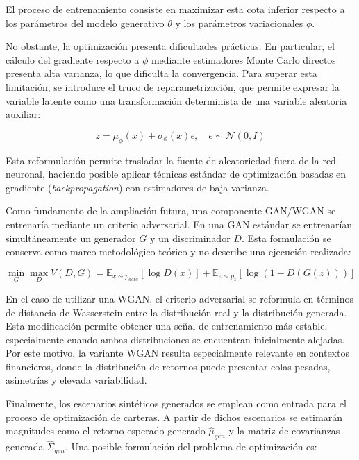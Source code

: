 El proceso de entrenamiento consiste en maximizar esta cota inferior respecto a los parámetros del modelo generativo $\theta$ y los parámetros variacionales $\phi$.

No obstante, la optimización presenta dificultades prácticas. En particular, el cálculo del gradiente respecto a $\phi$ mediante estimadores Monte Carlo directos presenta alta varianza, lo que dificulta la convergencia. Para superar esta limitación, se introduce el truco de reparametrización, que permite expresar la variable latente como una transformación determinista de una variable aleatoria auxiliar:

\begin{equation}
z
=
\mu_{\phi}(x)
+
\sigma_{\phi}(x)\epsilon,
\quad
\epsilon \sim \mathcal{N}(0,I)
\end{equation}

Esta reformulación permite trasladar la fuente de aleatoriedad fuera de la red neuronal, haciendo posible aplicar técnicas estándar de optimización basadas en gradiente (\textit{backpropagation}) con estimadores de baja varianza.

Como fundamento de la ampliación futura, una componente GAN/WGAN se entrenaría mediante un criterio adversarial. En una GAN estándar se entrenarían simultáneamente un generador $G$ y un discriminador $D$. Esta formulación se conserva como marco metodológico teórico y no describe una ejecución realizada:

\begin{equation}
\min_{G}\max_{D} V(D,G)
=
\mathbb{E}_{x \sim p_{data}}
\left[
\log D(x)
\right]
+
\mathbb{E}_{z \sim p_z}
\left[
\log \left(1-D(G(z))\right)
\right]
\end{equation}

En el caso de utilizar una WGAN, el criterio adversarial se reformula en términos de distancia de Wasserstein entre la distribución real y la distribución generada. Esta modificación permite obtener una señal de entrenamiento más estable, especialmente cuando ambas distribuciones se encuentran inicialmente alejadas. Por este motivo, la variante WGAN resulta especialmente relevante en contextos financieros, donde la distribución de retornos puede presentar colas pesadas, asimetrías y elevada variabilidad.

Finalmente, los escenarios sintéticos generados se emplean como entrada para el proceso de optimización de carteras. A partir de dichos escenarios se estimarán magnitudes como el retorno esperado generado $\hat{\mu}_{gen}$ y la matriz de covarianzas generada $\hat{\Sigma}_{gen}$. Una posible formulación del problema de optimización es:

